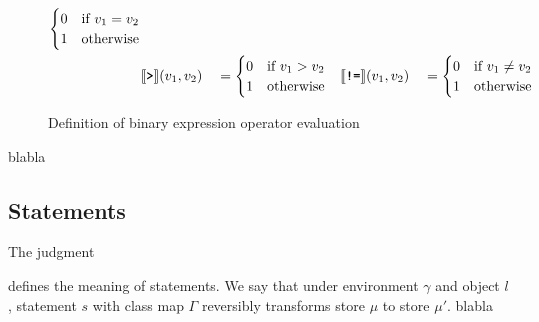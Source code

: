\begin{figure}[ht]
\begin{align*}
\begin{cases}
            0 & \text{if}\ v_1 = v_2\\
            1 & \text{otherwise}
        \end{cases}\\
        &\llbracket\texttt{\textbf{>}}\rrbracket (v_1, v_2) &&= \begin{cases}
            0 & \text{if}\ v_1 > v_2\\ 
            1 & \text{otherwise}
        \end{cases}
        &\llbracket\texttt{\textbf{!=}}\rrbracket (v_1, v_2) &&&= \begin{cases}
            0 & \text{if}\ v_1 \not= v_2\\
            1 & \text{otherwise}
        \end{cases}
    \end{align*} 
    \caption{Definition of binary expression operator evaluation}
\end{figure}

blabla

\subsection{Statements}
\label{subsec:semantics-statements}
The judgment
\begin{prooftree}
\end{prooftree}
defines the meaning of statements. We say that under environment $\gamma$ and object $l$, statement $s$ with class map $\Gamma$ reversibly transforms store $\mu$ to store $\mu'$. 
blabla

